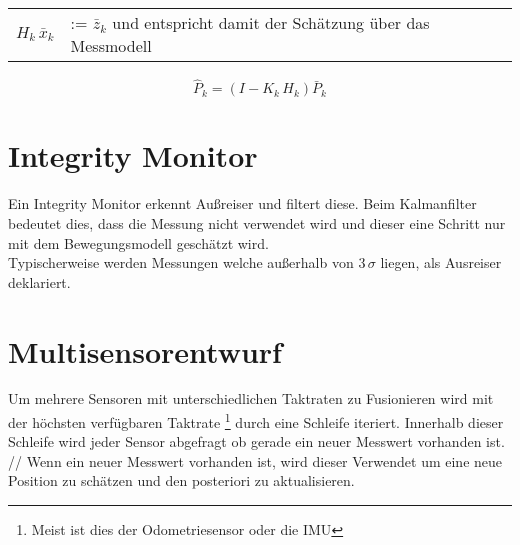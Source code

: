 \begin{enumerate}
	\begin{tabular}{cl}
		$H_k \, \bar{x}_k$ & := $\bar{z}_k$ und entspricht damit der Schätzung über das Messmodell\\
	\end{tabular}

	\begin{equation}
		\hat{P}_k = (I - K_k \, H_k)\bar{P}_k
	\end{equation}
	
\end{enumerate}

\section{Integrity Monitor}
Ein Integrity Monitor erkennt Außreiser und filtert diese. Beim Kalmanfilter bedeutet dies, dass die Messung nicht verwendet wird und dieser eine Schritt nur mit dem Bewegungsmodell geschätzt wird. \\
Typischerweise werden Messungen welche außerhalb von $ 3 \, \sigma $ liegen, als Ausreiser deklariert.

\section{Multisensorentwurf}
Um mehrere Sensoren mit unterschiedlichen Taktraten zu Fusionieren wird mit der höchsten verfügbaren Taktrate \footnote{Meist ist dies der Odometriesensor oder die IMU} durch eine Schleife iteriert. Innerhalb dieser Schleife wird jeder Sensor abgefragt ob gerade ein neuer Messwert vorhanden ist. //
Wenn ein neuer Messwert vorhanden ist, wird dieser Verwendet um eine neue Position zu schätzen und den posteriori zu aktualisieren. 